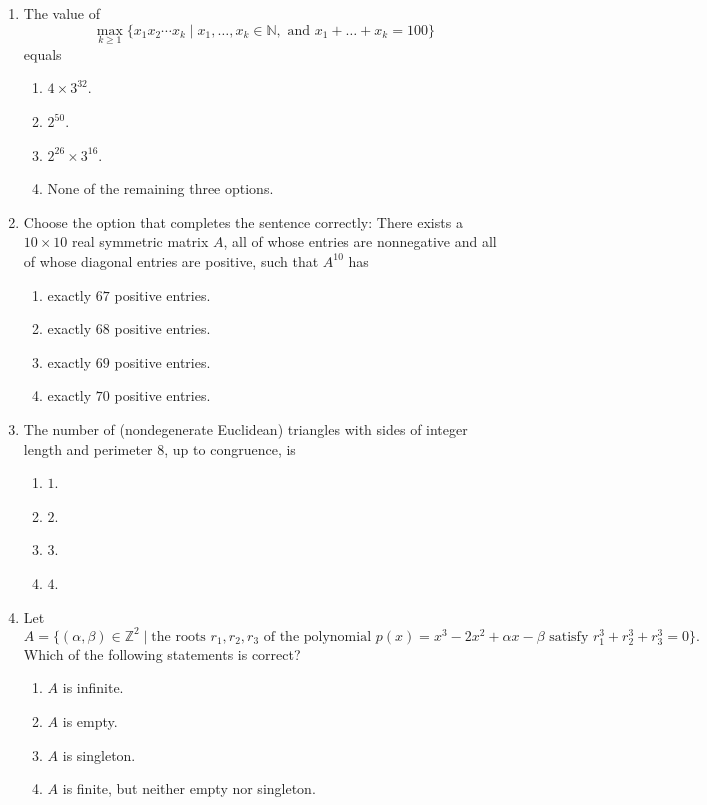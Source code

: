 \documentclass[11pt, a4paper]{article}
\begin{document}
\begin{enumerate}
  \item The value of
  \[
    \max_{k \ge 1} \{x_1 x_2 \cdots x_k \mid x_1, \dots, x_k \in \mathbb{N}, \text{ and } x_1 + \dots + x_k = 100\}
  \]
  equals
  \begin{enumerate}[label=(\alph*)]
    \item $4 \times 3^{32}$.
    \item $2^{50}$.
    \item $2^{26} \times 3^{16}$.
    \item None of the remaining three options.
  \end{enumerate}

  \item Choose the option that completes the sentence correctly: There exists a $10 \times 10$ real symmetric matrix $A$, all of whose entries are nonnegative and all of whose diagonal entries are positive, such that $A^{10}$ has
  \begin{enumerate}[label=(\alph*)]
    \item exactly $67$ positive entries.
    \item exactly $68$ positive entries.
    \item exactly $69$ positive entries.
    \item exactly $70$ positive entries.
  \end{enumerate}

  \item The number of (nondegenerate Euclidean) triangles with sides of integer length and perimeter $8$, up to congruence, is
  \begin{enumerate}[label=(\alph*)]
    \item $1$.
    \item $2$.
    \item $3$.
    \item $4$.
  \end{enumerate}

  \item Let
  \[
    A = \{(\alpha, \beta) \in \mathbb{Z}^2 \mid \text{the roots } r_1, r_2, r_3 \text{ of the polynomial } p(x) = x^3 - 2x^2 + \alpha x - \beta \text{ satisfy } r_1^3 + r_2^3 + r_3^3 = 0\}.
  \]
  Which of the following statements is correct?
  \begin{enumerate}[label=(\alph*)]
    \item $A$ is infinite.
    \item $A$ is empty.
    \item $A$ is singleton.
    \item $A$ is finite, but neither empty nor singleton.
  \end{enumerate}
\end{enumerate}
\end{document}
